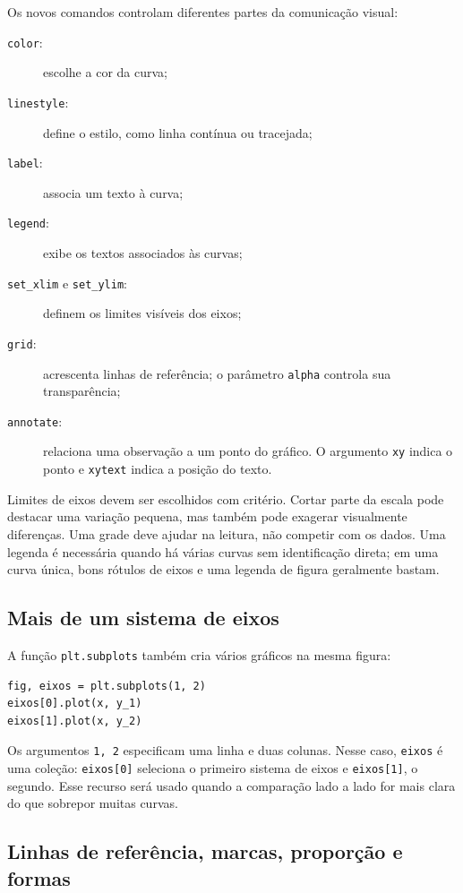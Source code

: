 Os novos comandos controlam diferentes partes da comunicação visual:

\begin{description}
  \item[\texttt{color}:] escolhe a cor da curva;
  \item[\texttt{linestyle}:] define o estilo, como linha contínua ou tracejada;
  \item[\texttt{label}:] associa um texto à curva;
  \item[\texttt{legend}:] exibe os textos associados às curvas;
  \item[\texttt{set\_xlim} e \texttt{set\_ylim}:] definem os limites visíveis dos eixos;
  \item[\texttt{grid}:] acrescenta linhas de referência; o parâmetro \texttt{alpha} controla sua transparência;
  \item[\texttt{annotate}:] relaciona uma observação a um ponto do gráfico. O argumento \texttt{xy} indica o ponto e \texttt{xytext} indica a posição do texto.
\end{description}

Limites de eixos devem ser escolhidos com critério. Cortar parte da escala pode destacar uma variação pequena, mas também pode exagerar visualmente diferenças. Uma grade deve ajudar na leitura, não competir com os dados. Uma legenda é necessária quando há várias curvas sem identificação direta; em uma curva única, bons rótulos de eixos e uma legenda de figura geralmente bastam.

\subsection{Mais de um sistema de eixos}

A função \texttt{plt.subplots} também cria vários gráficos na mesma figura:

\begin{lstlisting}
fig, eixos = plt.subplots(1, 2)
eixos[0].plot(x, y_1)
eixos[1].plot(x, y_2)
\end{lstlisting}

Os argumentos \texttt{1, 2} especificam uma linha e duas colunas. Nesse caso, \texttt{eixos} é uma coleção: \texttt{eixos[0]} seleciona o primeiro sistema de eixos e \texttt{eixos[1]}, o segundo. Esse recurso será usado quando a comparação lado a lado for mais clara do que sobrepor muitas curvas.

\subsection{Linhas de referência, marcas, proporção e formas}

